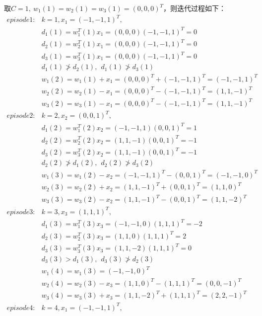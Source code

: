 \documentclass[a4paper, UTF8, 12pt]{ctexart}
\begin{document}
    取$C=1,\  w_1(1) = w_2(1) = w_3(1) = (0,0,0)^T$，则迭代过程如下：
        \begin{align*}
          episode1: &k=1,x_1 = {\left(-1,-1,1\right)}^T ,\\
            &d_1(1)=w_1^T(1)x_1=(0,0,0)(-1,-1,1)^T=0 \\
            &d_2(1)=w_2^T(1)x_1=(0,0,0)(-1,-1,1)^T=0 \\
            &d_3(1)=w_3^T(1)x_1=(0,0,0)(-1,-1,1)^T=0 \\
            & d_1(1) \not> d_2(1) ,\ \  d_1(1) \not> d_3(1) \\
            &w_1(2)=w_1(1)+x_1=(0,0,0)^T+(-1,-1,1)^T=(-1,-1,1)^T \\
            &w_2(2)=w_2(1)-x_1=(0,0,0)^T-(-1,-1,1)^T=(1,1,-1)^T \\
            &w_3(2)=w_3(1)-x_1=(0,0,0)^T-(-1,-1,1)^T=(1,1,-1)^T \\
          episode2: &k=2,x_2 = {\left(0,0,1\right)}^T ,\\
            &d_1(2)=w_1^T(2)x_2=(-1,-1,1)(0,0,1)^T=1 \\
            &d_2(2)=w_2^T(2)x_2=(1,1,-1)(0,0,1)^T=-1 \\
            &d_3(2)=w_3^T(2)x_2=(1,1,-1)(0,0,1)^T=-1 \\
            & d_2(2) \not> d_1(2) ,\ \  d_2(2) \not> d_3(2) \\
            &w_1(3)=w_1(2)-x_2=(-1,-1,1)^T-(0,0,1)^T=(-1,-1,0)^T \\
            &w_2(3)=w_2(2)+x_2=(1,1,-1)^T+(0,0,1)^T=(1,1,0)^T \\
            &w_3(3)=w_3(2)-x_2=(1,1,-1)^T-(0,0,1)^T=(1,1,-2)^T \\
          episode3 : &k=3,x_3= {\left(1,1,1 \right)}^T ,\\
            &d_1(3)=w_1^T(3)x_3=(-1,-1,0)(1,1,1)^T= -2\\
            &d_2(3)=w_2^T(3)x_3=(1,1,0)(1,1,1)^T= 2 \\
            &d_3(3)=w_3^T(3)x_3=(1,1,-2)(1,1,1)^T= 0 \\
            & d_3(3) > d_1(3) ,\ \  d_3(3) \not> d_2(3) \\
            &w_1(4)=w_1(3)=(-1,-1,0)^T \\
            &w_2(4)=w_2(3)-x_3=(1,1,0)^T-(1,1,1)^T=(0,0,-1)^T \\
            &w_3(4)=w_3(3)+x_3=(1,1,-2)^T+(1,1,1)^T= (2,2,-1)^T \\
          episode4: &k=4,x_1 = {\left(-1,-1,1\right)}^T ,\\

\end{align*}
\end{document}
